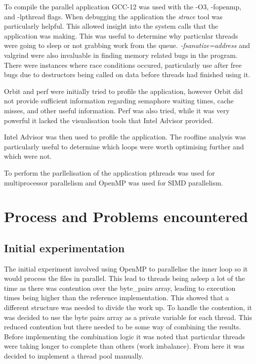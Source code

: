 \documentclass{article}
\begin{document}
To compile the parallel application GCC-12 was used with the -O3, -fopenmp, and -lpthread flags. When debugging 
the application the \textit{strace} tool was particularly helpful. This allowed insight into the system calls that
the application was making. This was useful to determine why particular threads were going to sleep or not grabbing
work from the queue. \textit{-fsanatize=address} and valgrind were also invaluable in finding memory related bugs in the program.
There were instances where race conditions occured, particularly use after free bugs due to destructors being called
on data before threads had finished using it.

Orbit and perf were initially tried to profile the application, however Orbit did not provide sufficient
information regarding semaphore waiting times, cache misses, and other useful information. Perf was also 
tried, while it was very powerful it lacked the visualisation tools that Intel Advisor provided.

Intel Advisor was then used to profile the application. The roofline analysis was particularly useful to determine 
which loops were worth optimising further and which were not.

To perform the parllelisation of the application pthreads was used for multiprocessor parallelism and 
OpenMP was used for SIMD parallelism. 


\section{Process and Problems encountered}

\subsection{Initial experimentation}
The initial experiment involved using OpenMP to parallelise the inner loop so it would process the files in 
parallel. This lead to threads being asleep a lot of the time as there was contention over the byte\_pairs 
array, leading to execution times being higher than the reference implementation. This showed that a different 
structure was needed to divide the work up. To handle the contention, it was decided to use the byte pairs 
array as a private variable for each thread. This reduced contention but there needed to be some way of 
combining the results. Before implementing the combination logic it was noted that particular threads were 
taking longer to complete than others (work imbalance). From here it was decided to implement a thread pool 
manually.
\end{document}
